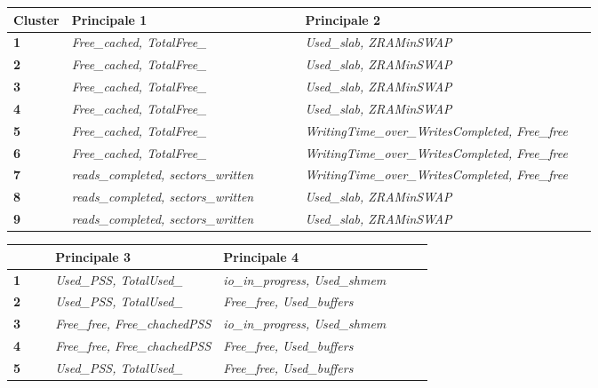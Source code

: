 \begin{figure}
\centering
   \begin{tabular}{p{0.1\linewidth} || p{0.4\linewidth} | p{0.55\linewidth}}
     \textbf{Cluster} & \textbf{Principale 1} & \textbf{Principale 2} \\
     \hline
     \hline
     \textbf{1} & \textit{Free\_cached, TotalFree\_} & \textit{Used\_slab, ZRAMinSWAP} \\
     \hline
     \textbf{2} & \textit{Free\_cached, TotalFree\_} & \textit{Used\_slab, ZRAMinSWAP} \\
     \hline
     \textbf{3} & \textit{Free\_cached, TotalFree\_} & \textit{Used\_slab, ZRAMinSWAP} \\
     \hline
     \textbf{4} & \textit{Free\_cached, TotalFree\_} & \textit{Used\_slab, ZRAMinSWAP} \\
     \hline
     \textbf{5} & \textit{Free\_cached, TotalFree\_} & \textit{WritingTime\_over\_WritesCompleted, Free\_free} \\
     \hline
     \textbf{6} & \textit{Free\_cached, TotalFree\_} & \textit{WritingTime\_over\_WritesCompleted, Free\_free} \\
     \hline
     \textbf{7} & \textit{reads\_completed, sectors\_written} &	\textit{WritingTime\_over\_WritesCompleted, Free\_free} \\
     \hline
     \textbf{8} &  \textit{reads\_completed, sectors\_written} & \textit{Used\_slab, ZRAMinSWAP} \\
     \hline
     \textbf{9} &  \textit{reads\_completed, sectors\_written} & \textit{Used\_slab, ZRAMinSWAP} \\
     \hline
   \end{tabular}
  \begin{tabular}{p{0.1\linewidth} || p{0.4\linewidth} | p{0.55\linewidth}}
   & \textbf{Principale 3} & \textbf{Principale 4}  \\
    \hline
    \hline
    \textbf{1} & \textit{Used\_PSS, TotalUsed\_} & \textit{io\_in\_progress, Used\_shmem} \\
    \hline
    \textbf{2} & \textit{Used\_PSS, TotalUsed\_} & \textit{Free\_free, Used\_buffers} \\
    \hline
    \textbf{3} & \textit{Free\_free, Free\_chachedPSS} & \textit{io\_in\_progress, Used\_shmem} \\
    \hline
    \textbf{4} & \textit{Free\_free, Free\_chachedPSS} & \textit{Free\_free, Used\_buffers} \\
    \hline
    \textbf{5} & \textit{Used\_PSS, TotalUsed\_}  & \textit{Free\_free, Used\_buffers} \\

\end{tabular}
\end{figure}
